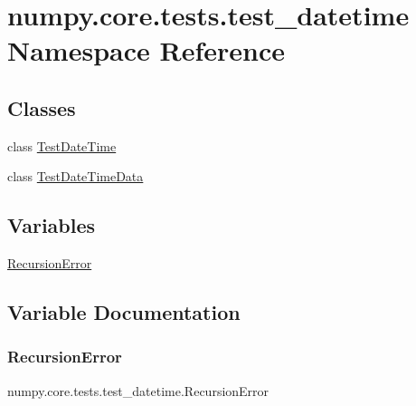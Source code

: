 \hypertarget{namespacenumpy_1_1core_1_1tests_1_1test__datetime}{}\section{numpy.\+core.\+tests.\+test\+\_\+datetime Namespace Reference}
\label{namespacenumpy_1_1core_1_1tests_1_1test__datetime}
\subsection*{Classes}
\begin{DoxyCompactItemize}
\item 
class \hyperlink{classnumpy_1_1core_1_1tests_1_1test__datetime_1_1TestDateTime}{Test\+Date\+Time}
\item 
class \hyperlink{classnumpy_1_1core_1_1tests_1_1test__datetime_1_1TestDateTimeData}{Test\+Date\+Time\+Data}
\end{DoxyCompactItemize}
\subsection*{Variables}
\begin{DoxyCompactItemize}
\item 
\hyperlink{namespacenumpy_1_1core_1_1tests_1_1test__datetime_ac7e2d0d972e3b74de2fb3bb777c8a996}{Recursion\+Error}
\end{DoxyCompactItemize}


\subsection{Variable Documentation}
\mbox{\label{namespacenumpy_1_1core_1_1tests_1_1test__datetime_ac7e2d0d972e3b74de2fb3bb777c8a996}} 
\subsubsection{\texorpdfstring{Recursion\+Error}{RecursionError}}
{\footnotesize\ttfamily numpy.\+core.\+tests.\+test\+\_\+datetime.\+Recursion\+Error}

